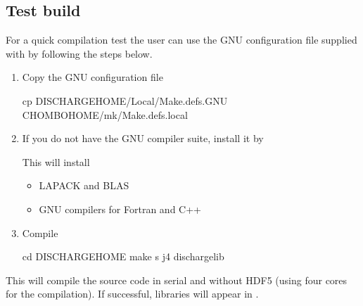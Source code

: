 \documentclass[letterpaper,10pt,english]{sphinxmanual}
\begin{document}
\subsection{Test build}
\label{\detokenize{Base/GettingStarted:test-build}}
For a quick compilation test the user can use the GNU configuration file supplied with  by following the steps below.
\begin{enumerate}
%
\item {} 
Copy the GNU configuration file

\begin{sphinxVerbatim}[commandchars=\\\{\},formatcom=\scriptsize]
cp \PYGZdl{}DISCHARGE\PYGZus{}HOME/Local/Make.defs.GNU \PYGZdl{}CHOMBO\PYGZus{}HOME/mk/Make.defs.local
\end{sphinxVerbatim}

\item {} 
If you do not have the GNU compiler suite, install it by

\begin{sphinxVerbatim}[commandchars=\\\{\},formatcom=\scriptsize]
       
\end{sphinxVerbatim}

This will install
\begin{itemize}
\item {} 
LAPACK and BLAS

\item {} 
GNU compilers for Fortran and C++

\end{itemize}

\item {} 
Compile 

\begin{sphinxVerbatim}[commandchars=\\\{\},formatcom=\scriptsize]
cd \PYGZdl{}DISCHARGE\PYGZus{}HOME
make \PYGZhy{}s \PYGZhy{}j4 discharge\PYGZhy{}lib
\end{sphinxVerbatim}

\end{enumerate}

This will compile the  source code in serial and without HDF5 (using four cores for the compilation).
If successful,  libraries will appear in .
\end{document}
